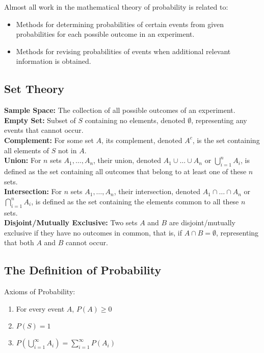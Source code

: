 \documentclass[11pt]{article}
\begin{document}
Almost all work in the mathematical theory of probability is related to:
\begin{itemize}
    \item Methods for determining probabilities of certain events from given probabilities for
    each possible outcome in an experiment.
    \item Methods for revising probabilities of events when additional relevant information is 
    obtained.
\end{itemize}

\subsection{Set Theory}

\textbf{Sample Space:} The collection of all possible outcomes of an experiment. \\
\textbf{Empty Set:} Subset of $S$ containing no elements, denoted $\emptyset$, representing
any events that cannot occur. \\
\textbf{Complement:} For some set $A$, its complement, denoted $A^c$, is the set containing all 
elements of $S$ not in $A$. \\
\textbf{Union:} For $n$ sets $A_1, \ldots, A_n$, their union, denoted $A_1 \cup \ldots \cup A_n
$ or $ \bigcup_{i=1}^{n} A_i $, is defined as the set containing all outcomes that belong to at
least one of these $n$ sets. \\
\textbf{Intersection:} For $n$ sets $A_1, \ldots, A_n$, their intersection, denoted $A_1 \cap 
\ldots \cap A_n $ or $ \bigcap_{i=1}^{n} A_i $, is defined as the set containing the elements 
common to all these $n$ sets. \\
\textbf{Disjoint/Mutually Exclusive:} Two sets $A$ and $B$ are disjoint/mutually exclusive if 
they have no outcomes in common, that is, if $ A \cap B = \emptyset $, representing that both
$A$ and $B$ cannot occur.

\subsection{The Definition of Probability}

Axioms of Probability:
\begin{enumerate}
    \item For every event $A$, $P(A) \ge 0$
    \item $P(S) = 1$
    \item $P( \bigcup_{i=1}^{\infty} A_i) = \sum_{i=1}^{\infty}P(A_i)$
\end{enumerate}
\end{document}
